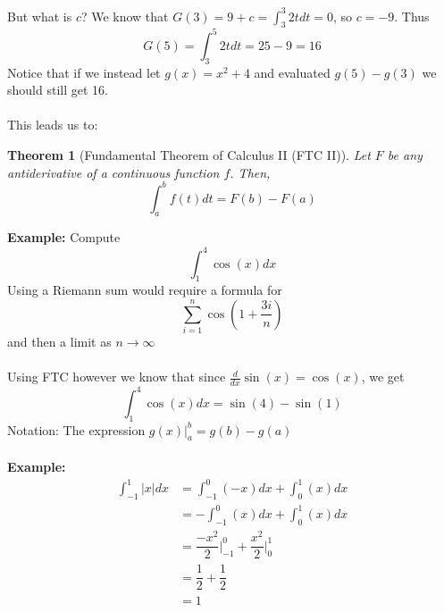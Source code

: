 \documentclass[10pt]{article}
\theoremstyle{break}
\newtheorem{thm}{Theorem}[subsection]
\begin{document}
But what is $c$? We know that $G(3) = 9 + c = \int^3_3 2t dt = 0$, so $c = -9$. Thus $$G(5) = \int^5_3 2t dt = 25 - 9 = 16$$
Notice that if we instead let $g(x) = x^2 + 4$ and evaluated $g(5) - g(3)$ we should still get 16. \\ \: \\
This leads us to: 
\begin{thm}[Fundamental Theorem of Calculus II (FTC II)]
  Let $F$ be any antiderivative of a continuous function $f$. Then, $$\int^b_a f(t) dt = F(b) - F(a)$$
\end{thm}
\textbf{Example:} Compute $$\int^4_1 \cos(x) dx$$
Using a Riemann sum would require a formula for $$\sum^n_{i=1} \cos(1 + \frac{3i}{n})$$ and then a limit as $n \to \infty$ \\ \: \\
Using FTC however we know that since $\frac{d}{dx} \sin(x) = \cos(x)$, we get $$\int^4_1 \cos(x) dx = \sin(4) - \sin(1)$$
Notation: The expression $g(x) \big |^b_a = g(b) - g(a)$ \\ \: \\
\textbf{Example:} 
\begin{align*}
  \int^1_{-1} |x| dx &= \int^0_{-1} (-x) dx + \int^1_0 (x) dx\\
  &= - \int^0_{-1} (x) dx + \int^1_0 (x) dx\\
  &= \dfrac{-x^2}{2} \bigg|^0_{-1} + \dfrac{x^2}{2} \bigg|^1_0\\
  &= \dfrac{1}{2} + \dfrac{1}{2} \\
  &= 1
\end{align*}
\end{document}
